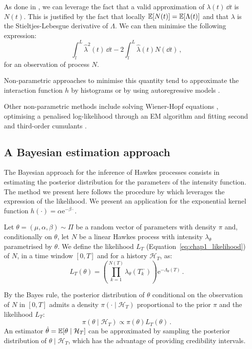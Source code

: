As done in \textcite{Reynaud2014}, we can leverage the fact that a valid approximation of $\lambda(t)\,\dd t$ is $N(t)$. 
This is justified by the fact that locally ${\mathbb E}[N(t)] = {\mathbb E}[\Lambda(t)]$ and that $\lambda$ is the Stieltjes-Lebesgue derivative of $\Lambda$.
We can then minimise the following expression:
\[\int_{l}^{L}{\hat \lambda^2(t)\,\dd t} - 2\int_{l}^{L}{\hat \lambda(t)N(\dd t)}\,,\]
for an observation of process $N$.

Non-parametric approaches to minimise this quantity tend to approximate the interaction function $h$ by histograms \parencite{Lemonnier2014, Reynaud2014} or by using autoregressive models \parencite{Kirchner2017}.

Other non-parametric methods include solving Wiener-Hopf equations \parencite{Bacry2016}, optimising a penalised log-likelihood through an EM algorithm \parencite{Lewis2011} and fitting second and third-order cumulants \parencite{Achab2016}. 

\subsection{A Bayesian estimation approach}\label{sec:chap1_bayesian_estimation}

The Bayesian approach for the inference of Hawkes processes consists in estimating the posterior distribution for the parameters of the intensity function.
The method we present here follows the procedure by \textcite{Rasmussen2013} which leverages the expression of the likelihood. 
We present an application for the exponential kernel function $h(\cdot) = \alpha \mathrm{e}^{-\beta \cdot}$.

Let $\theta = (\mu, \alpha, \beta)\sim \Pi$ be a random vector of parameters with density $\pi$ and, conditionally on $\theta$, let $N$ be a linear Hawkes process with intensity $\lambda_\theta$ parametrised by $\theta$.
We define the likelihood $L_T$ (Equation~\eqref{eq:chap1_likelihood}) of $N$, in a time window $[0, T]$ and for a history $\mathcal{H}_T$, as:
\[L_T(\theta) = \left(\prod_{k=1}^{N(T)}{\lambda_\theta(T_k^-)}\right)\mathrm{e}^{-\Lambda_\theta(T)}\,.\]

By the Bayes rule, the posterior distribution of $\theta$ conditional on the observation of $N$ in $[0,T]$ admits a density $\pi(\cdot\mid\mathcal{H}_T)$ proportional to the prior $\pi$ and the likelihood $L_T$:
\[\pi(\theta\mid \mathcal{H}_T) \propto \pi(\theta) L_T(\theta)\,.\]
An estimator $\hat \theta = {\mathbb E}[\theta\mid \mathcal{H}_T]$ can be approximated by sampling the posterior distribution of $\theta\mid\mathcal{H}_T$, which has the advantage of providing credibility intervals.

